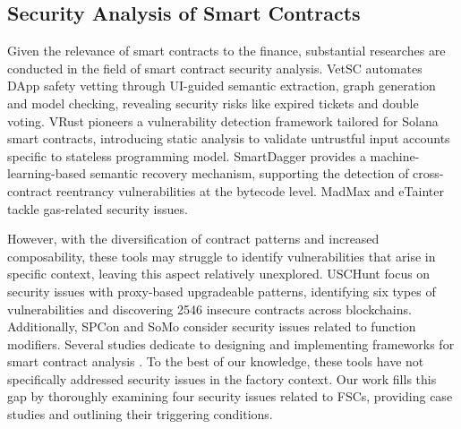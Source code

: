 \documentclass[acmsmall,screen]{acmart}
\begin{document}
	\subsection{Security Analysis of Smart Contracts} Given the relevance of smart contracts to the finance, substantial researches \cite{DBLP:conf/kbse/XueMLSYP20,DBLP:conf/issta/LiaoZCN22,DBLP:conf/issta/GhalebRP22,DBLP:journals/pacmpl/GrechKJBSS18,DBLP:conf/uss/0001L21,DBLP:conf/pldi/BrentGLSS20, DBLP:conf/ccs/DuanZPLLX022} are conducted in the field of smart contract security analysis. VetSC \cite{DBLP:conf/ccs/DuanZPLLX022} automates DApp safety vetting through UI-guided semantic extraction, graph generation and model checking, revealing security risks like expired tickets and double voting. VRust \cite{DBLP:conf/ccs/CuiZGT022} pioneers a vulnerability detection framework tailored for Solana smart contracts, introducing static analysis to validate untrustful input accounts specific to stateless programming model. SmartDagger \cite{DBLP:conf/issta/LiaoZCN22} provides a machine-learning-based semantic recovery mechanism, supporting the detection of cross-contract reentrancy vulnerabilities at the bytecode level. MadMax \cite{DBLP:journals/pacmpl/GrechKJBSS18} and eTainter \cite{DBLP:conf/issta/GhalebRP22} tackle gas-related security issues.

	However, with the diversification of contract patterns and increased composability, these tools may struggle to identify vulnerabilities that arise in specific context, leaving this aspect relatively unexplored. USCHunt \cite{DBLP:conf/uss/BodellMD23} focus on security issues with proxy-based upgradeable patterns, identifying six types of vulnerabilities and discovering 2546 insecure contracts across blockchains. Additionally, SPCon \cite{DBLP:conf/issta/LiuL0A22} and SoMo \cite{DBLP:conf/issta/FangWYWCCLJ23} consider security issues related to function modifiers. Several studies dedicate to designing and implementing frameworks for smart contract analysis \cite{DBLP:conf/icse/FeistGG19,DBLP:conf/kbse/FerreiraCDA20,DBLP:conf/sp/SoLPLO20}. To the best of our knowledge, these tools have not specifically addressed security issues in the factory context. Our work fills this gap by thoroughly examining four security issues related to FSCs, providing case studies and outlining their triggering conditions.
\end{document}
